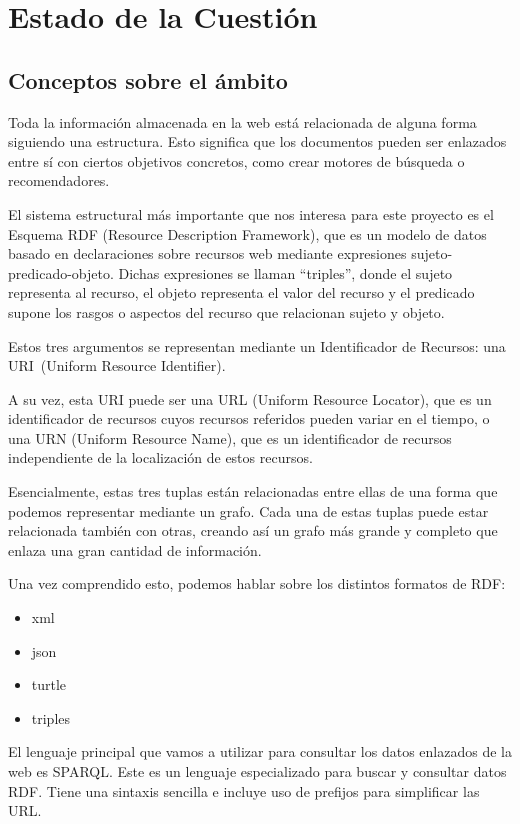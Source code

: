 \chapter{Estado de la Cuestión}
\label{cap:estadoDeLaCuestion}


\section{Conceptos sobre el ámbito}

Toda la información almacenada en la web está relacionada de alguna forma siguiendo una estructura. Esto significa que los documentos pueden ser enlazados entre sí con ciertos objetivos concretos, como crear motores de búsqueda o recomendadores.

El sistema estructural más importante que nos interesa para este proyecto es el Esquema RDF (Resource Description Framework), que es un modelo de datos basado en declaraciones sobre recursos web mediante expresiones sujeto-predicado-objeto. Dichas expresiones se llaman “triples”, donde el sujeto representa al recurso, el objeto representa el valor del recurso y el predicado supone los rasgos o aspectos del recurso que relacionan sujeto y objeto.\cite{sakr2018}

Estos tres argumentos se representan mediante un Identificador de Recursos: una URI~(Uniform Resource Identifier).\cite{sakr2018,berners1998}

A su vez, esta URI puede ser una URL (Uniform Resource Locator), que es un identificador de recursos cuyos recursos referidos pueden variar en el tiempo, o una URN (Uniform Resource Name), que es un identificador de recursos independiente de la localización de estos recursos.\cite{berners1994,saint2017,sakr2018}

Esencialmente, estas tres tuplas están relacionadas entre ellas de una forma que podemos representar mediante un grafo. Cada una de estas tuplas puede estar relacionada también con otras, creando así un grafo más grande y completo que enlaza una gran cantidad de información.

Una vez comprendido esto, podemos hablar sobre los distintos formatos de RDF:
\begin{itemize}
\item xml
\item json
\item turtle
\item triples
\end{itemize}

El lenguaje principal que vamos a utilizar para consultar los datos enlazados de la web es SPARQL. Este es un lenguaje especializado para buscar y consultar datos RDF. Tiene una sintaxis sencilla e incluye uso de prefijos para simplificar las URL.

